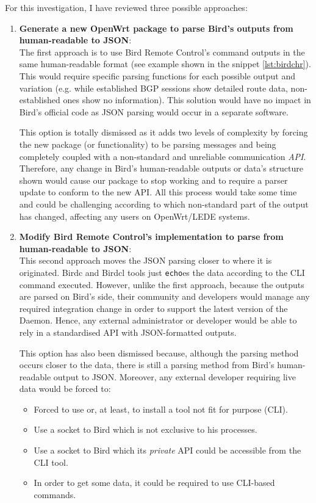 For this investigation, I have reviewed three possible approaches:

\begin{enumerate}
    \item \textbf{Generate a new OpenWrt package to parse Bird's outputs from human-readable to JSON}:\\
The first approach is to use Bird Remote Control's command outputs in the same human-readable format (see example shown in the snippet \ref{lst:birdchr}). This would require specific parsing functions for each possible output and variation (e.g. while established BGP sessions show detailed route data, non-established ones show no information). This solution would have no impact in Bird's official code as JSON parsing would occur in a separate software.
    
This option is totally dismissed as it adds two levels of complexity by forcing the new package (or functionality) to be parsing messages and being completely coupled with a non-standard and unreliable communication \textit{API}. Therefore, any change in Bird's human-readable outputs or data's structure shown would cause our package to stop working and to require a parser update to conform to the new API. All this process would take some time and could be challenging according to which non-standard part of the output has changed, affecting any users on OpenWrt/LEDE systems.


    \item \textbf{Modify Bird Remote Control's implementation to parse from human-readable to JSON}:\\
This second approach moves the JSON parsing closer to where it is originated. Birdc and Birdcl tools just \texttt{echo}es the data according to the CLI command executed. However, unlike the first approach, because the outputs are parsed on Bird's side, their community and developers would manage any required integration change in order to support the latest version of the Daemon. Hence, any external administrator or developer would be able to rely in a standardised API with JSON-formatted outputs.

This option has also been dismissed because, although the parsing method occurs closer to the data, there is still a parsing method from Bird's human-readable output to JSON. Moreover, any external developer requiring live data would be forced to:

\begin{itemize}
    \item Forced to use or, at least, to install a tool not fit for purpose (CLI).
    \item Use a socket to Bird which is not exclusive to his processes.
    \item Use a socket to Bird which its \textit{private} API could be accessible from the CLI tool.
    \item In order to get some data, it could be required to use CLI-based commands.
\end{itemize}


\end{enumerate}
